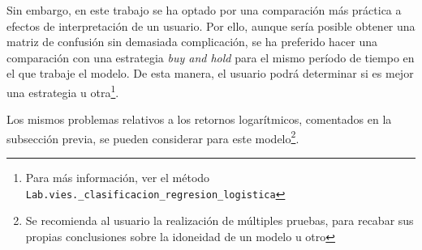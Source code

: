Sin embargo, en este trabajo se ha optado por una comparación más práctica a efectos de interpretación de un usuario. Por ello, aunque sería posible obtener una matriz de confusión sin demasiada complicación, se ha preferido hacer una comparación con una estrategia \emph{buy and hold} para el mismo período de tiempo en el que trabaje el modelo. De esta manera, el usuario podrá determinar si es mejor una estrategia u otra\footnote{Para más información, ver el método \texttt{Lab.vies.\_clasificacion\_regresion\_logistica}}.

Los mismos problemas relativos a los retornos logarítmicos, comentados en la subsección previa, se pueden considerar para este modelo\footnote{Se recomienda al usuario la realización de múltiples pruebas, para recabar sus propias conclusiones sobre la idoneidad de un modelo u otro}.